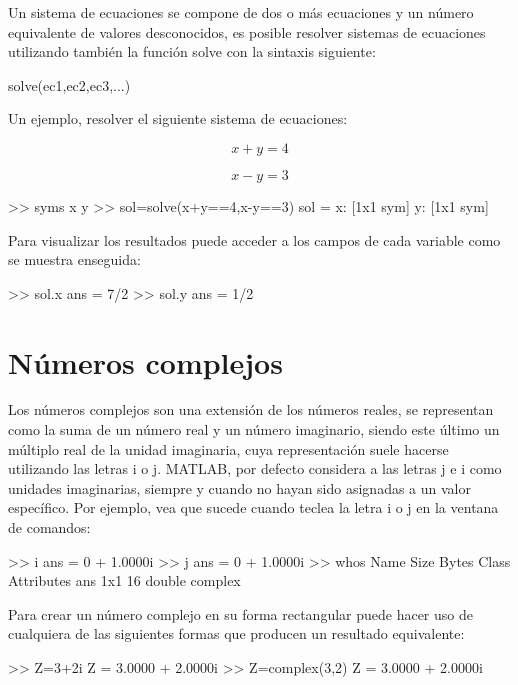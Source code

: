 Un sistema de ecuaciones se compone de dos o más ecuaciones y un número
equivalente de valores desconocidos, es posible resolver sistemas de
ecuaciones utilizando también la función solve con la sintaxis
siguiente:

\begin{matlab}
solve(ec1,ec2,ec3,...)
\end{matlab}

Un ejemplo, resolver el siguiente sistema de ecuaciones:

$$ x+y=4 $$ 

$$ x-y=3 $$

\begin{matlab}
>> syms x y
>> sol=solve(x+y==4,x-y==3)
sol = 
    x: [1x1 sym]
    y: [1x1 sym]
\end{matlab}

Para visualizar los resultados puede acceder a los campos de cada
variable como se muestra enseguida:

\begin{matlab}
>> sol.x 
ans =
7/2
>> sol.y
ans =
1/2
\end{matlab}

\section{Números complejos}

Los números complejos son una extensión de los números reales, se
representan como la suma de un número real y un número imaginario,
siendo este último un múltiplo real de la unidad imaginaria, cuya
representación suele hacerse utilizando las letras i o j. MATLAB, por
defecto considera a las letras j e i como unidades imaginarias, siempre
y cuando no hayan sido asignadas a un valor específico. Por ejemplo, vea
que sucede cuando teclea la letra i o j en la ventana de comandos:

\begin{matlab}
>> i
ans =
        0 + 1.0000i
>> j
ans =
        0 + 1.0000i
>> whos
  Name      Size            Bytes  Class     Attributes
  ans       1x1                16  double    complex   
\end{matlab}

Para crear un número complejo en su forma rectangular puede hacer uso de
cualquiera de las siguientes formas que producen un resultado
equivalente:

\begin{matlab}
>> Z=3+2i
Z =
   3.0000 + 2.0000i
>> Z=complex(3,2)
Z =
   3.0000 + 2.0000i
\end{matlab}

